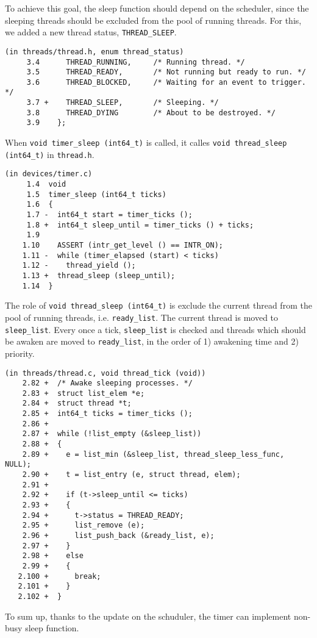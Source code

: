 \documentclass[a4paper,article,11pt,oneside]{article}
\begin{document}
To achieve this goal, the sleep function should depend on the
scheduler, since the sleeping threads should be excluded from the pool
of running threads. For this, we added a new thread status,
\texttt{THREAD\_SLEEP}.
\begin{verbatim}
(in threads/thread.h, enum thread_status)
     3.4      THREAD_RUNNING,     /* Running thread. */
     3.5      THREAD_READY,       /* Not running but ready to run. */
     3.6      THREAD_BLOCKED,     /* Waiting for an event to trigger. */
     3.7 +    THREAD_SLEEP,       /* Sleeping. */
     3.8      THREAD_DYING        /* About to be destroyed. */
     3.9    };
\end{verbatim}
When \texttt{void timer\_sleep (int64\_t)} is called, it calles
\texttt{void thread\_sleep (int64\_t)} in \texttt{thread.h}.
\begin{verbatim}
(in devices/timer.c)
     1.4  void
     1.5  timer_sleep (int64_t ticks) 
     1.6  {
     1.7 -  int64_t start = timer_ticks ();
     1.8 +  int64_t sleep_until = timer_ticks () + ticks;
     1.9  
    1.10    ASSERT (intr_get_level () == INTR_ON);
    1.11 -  while (timer_elapsed (start) < ticks) 
    1.12 -    thread_yield ();
    1.13 +  thread_sleep (sleep_until);
    1.14  }
\end{verbatim}
The role of \texttt{void thread\_sleep (int64\_t)} is exclude the
current thread from the pool of running threads,
i.e. \texttt{ready\_list}. The current thread is moved to
\texttt{sleep\_list}.
Every once a tick, \texttt{sleep\_list} is checked and threads which
should be awaken are moved to \texttt{ready\_list}, in the order of 1)
awakening time and 2) priority.
\begin{verbatim}
(in threads/thread.c, void thread_tick (void))
    2.82 +  /* Awake sleeping processes. */
    2.83 +  struct list_elem *e;
    2.84 +  struct thread *t;
    2.85 +  int64_t ticks = timer_ticks ();
    2.86 +
    2.87 +  while (!list_empty (&sleep_list))
    2.88 +  {
    2.89 +    e = list_min (&sleep_list, thread_sleep_less_func, NULL);
    2.90 +    t = list_entry (e, struct thread, elem);
    2.91 +
    2.92 +    if (t->sleep_until <= ticks)
    2.93 +    {
    2.94 +      t->status = THREAD_READY;
    2.95 +      list_remove (e);
    2.96 +      list_push_back (&ready_list, e);
    2.97 +    }
    2.98 +    else
    2.99 +    {
   2.100 +      break;
   2.101 +    }
   2.102 +  }
\end{verbatim}

To sum up, thanks to the update on the schuduler, the timer can
implement non-busy sleep function.
\end{document}
